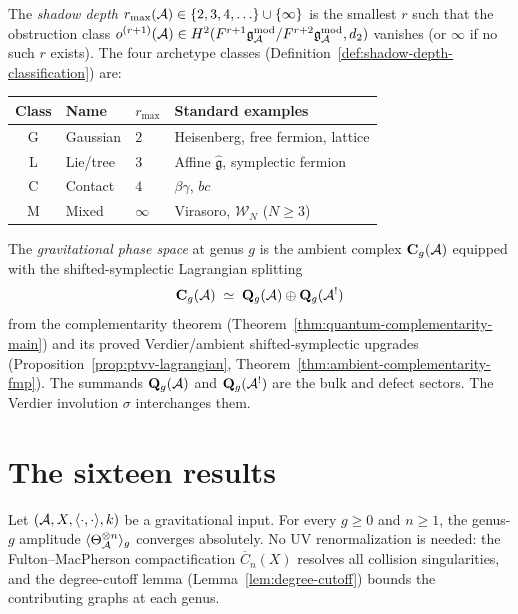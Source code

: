 \begin{definition}
\label{def:thqg-shadow-archetype}
The \emph{shadow depth} $r_{\max}(\mathcal{A}) \in \{2,3,4,\ldots\} \cup \{\infty\}$ is
the smallest $r$ such that the obstruction class
$o^{(r+1)}(\mathcal{A}) \in H^2(F^{r+1}\mathfrak{g}_{\mathcal{A}}^{\mathrm{mod}} / F^{r+2}\mathfrak{g}_{\mathcal{A}}^{\mathrm{mod}}, d_2)$ vanishes
(or $\infty$ if no such $r$ exists). The four archetype classes
(Definition~\ref{def:shadow-depth-classification}) are:
\begin{center}
\renewcommand{\arraystretch}{1.2}
\small
\begin{tabular}{clll}
\textbf{Class} & \textbf{Name} & $r_{\max}$ & \textbf{Standard examples} \\
\hline
G & Gaussian & $2$ & Heisenberg, free fermion, lattice \\
L & Lie/tree & $3$ & Affine $\widehat{\mathfrak{g}}$, symplectic fermion \\
C & Contact & $4$ & $\beta\gamma$, $bc$ \\
M & Mixed & $\infty$ & Virasoro, $\mathcal{W}_N$ ($N \ge 3$)
\end{tabular}
\end{center}
\end{definition}

\begin{definition}
\label{def:thqg-gravitational-phase-space}
The \emph{gravitational phase space} at genus $g$ is the ambient complex
$\mathbf{C}_g(\mathcal{A})$ equipped with the shifted-symplectic Lagrangian splitting
\begin{equation}\label{eq:thqg-lagrangian-splitting}
\mathbf{C}_g(\mathcal{A}) \;\simeq\; \mathbf{Q}_g(\mathcal{A}) \oplus \mathbf{Q}_g(\mathcal{A}^!)
\end{equation}
from the complementarity theorem (Theorem~\ref{thm:quantum-complementarity-main})
and its proved Verdier/ambient shifted-symplectic upgrades
\textup{(}Proposition~\ref{prop:ptvv-lagrangian},
Theorem~\ref{thm:ambient-complementarity-fmp}\textup{)}.
The summands $\mathbf{Q}_g(\mathcal{A})$ and $\mathbf{Q}_g(\mathcal{A}^!)$ are the bulk and defect
sectors. The Verdier involution $\sigma$ interchanges them.
\end{definition}

\section{The sixteen results}
\label{sec:thqg-ten-theorems}

\begin{theorem}\ClaimStatusProvedHere
\label{thm:thqg-g1-finiteness}
Let $(\mathcal{A}, X, \langle\cdot,\cdot\rangle, k)$ be a gravitational input.
For every $g \ge 0$ and $n \ge 1$, the genus-$g$ amplitude
$\langle \Theta_{\mathcal{A}}^{\otimes n} \rangle_g$ converges absolutely.
No UV renormalization is needed: the Fulton--MacPherson compactification
$\overline{C}_n(X)$ resolves all collision singularities, and
the degree-cutoff lemma (Lemma~\ref{lem:degree-cutoff}) bounds the contributing
graphs at each genus.
\end{theorem}

